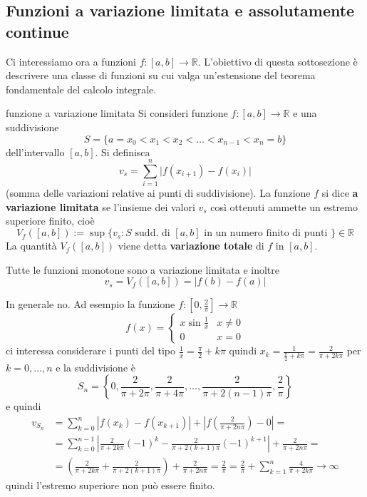 \subsection{Funzioni a variazione limitata e assolutamente continue}
Ci interessiamo ora a funzioni \(f : [a, b] \to \mathbb{R}\). L'obiettivo di questa sottosezione è 
descrivere una classe di funzioni su cui valga un'estensione del teorema fondamentale del calcolo integrale.
\begin{definition}{funzione a variazione limitata}
    Si consideri funzione \(f: [a,b] \to \mathbb{R}\) e una suddivisione
    \[
      S = \{a = x_{0} < x_{1} < x_{2} < \dots < x_{n-1} < x_{n} = b\} 
    \]
    dell'intervallo \([a,b]\). Si definisca
    \[
      v_s = \sum_{i=1}^{n} |f{(x_{i+1}) -f{(x_{i})}|} 
    \]
    (somma delle variazioni relative ai punti di suddivisione).
    La funzione \(f\) si dice \textbf{a variazione limitata} 
    se l'insieme dei valori \(v_s\) così ottenuti ammette un estremo superiore
    finito, cioè 
    \[
        V_f ([a, b]):= \sup \{v_s : S \text{ sudd. di \([a,b]\) in un numero
                finito di
        punti  } \} \in \mathbb{R} 
    \]
    La quantità \(V_f{([a,b])}\) viene detta \textbf{variazione totale} di \(f\) in \([a,b]\).
    
\end{definition}
\begin{example}
    Tutte le funzioni monotone sono a variazione limitata e inoltre
    \[
        v_s = V_f{([a,b])} = |f{(b)} - f{(a)}|
    \]
\end{example}
\begin{example}
    In generale no. Ad esempio la funzione \(f : [0, \frac{2}{\pi}] \to
    \mathbb{R}\) 
    \[
      f{(x)} = \begin{cases}
          x \sin \frac{1}{x} & x \neq 0 \\
          0 & x = 0
      \end{cases}
    \]
    ci interessa considerare i punti del tipo \(\frac{1}{x} = \frac{\pi}{2} + k
    \pi\) quindi \(x_k = \frac{1}{\frac{\pi}{2} + k \pi} = \frac{2}{\pi + 2k\pi}\) per \(k = 0, \dots,
    n\) e la suddivisione è
    \[
        S_{n} = \left\{0, \frac{2}{\pi + 2\pi}, \frac{2}{\pi + 4\pi}, \dots,
        \frac{2}{\pi + 2(n-1)\pi}, \frac{2}{\pi}\right\}
    \]
    e quindi
    \begin{align*}
        v_{S_{n}}  &= \sum_{k=0}^{n} |f{(x_k)} - f{(x_{k+1})}| + \left|f{\left(\frac{2}{\pi
        + 2n \pi}\right)} - 0\right| =  \\
                   &= \sum_{k=0}^{n-1} \left| \frac{2}{\pi + 2k\pi}{(-1)}^{k} -
                   \frac{2}{\pi + 2(k+1)\pi}{(-1)}^{k+1} \right| + \frac{2}{\pi
                   + 2n \pi} = \\
        &= {\left( \frac{2}{\pi + 2k\pi} + \frac{2}{\pi + 2{(k+1)}\pi} \right)}
        + \frac{2}{\pi + 2n \pi} = \frac{2}{\pi} = \frac{2}{\pi} +
        \sum_{k=1}^{n} \frac{4}{\pi + 2k\pi} \to \infty 
    \end{align*}
    quindi l'estremo superiore non può essere finito.

\end{example}
